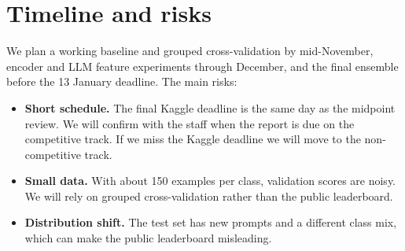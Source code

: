 \documentclass[11pt]{article}
\begin{document}
\section*{Timeline and risks}
We plan a working baseline and grouped cross-validation by mid-November, encoder and LLM
feature experiments through December, and the final ensemble before the 13 January deadline.
The main risks:
\begin{itemize}
  \item \textbf{Short schedule.} The final Kaggle deadline is the same day as the midpoint
        review. We will confirm with the staff when the report is due on the competitive track.
        If we miss the Kaggle deadline we will move to the non-competitive track.
  \item \textbf{Small data.} With about 150 examples per class, validation scores are noisy.
        We will rely on grouped cross-validation rather than the public leaderboard.
  \item \textbf{Distribution shift.} The test set has new prompts and a different class mix,
        which can make the public leaderboard misleading.
\end{itemize}
\end{document}
